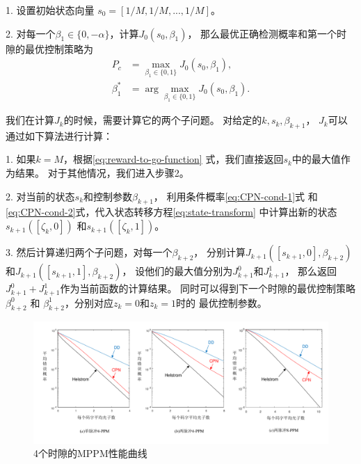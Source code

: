 1. 设置初始状态向量 $s_0=[1/M,1/M, ..., 1/M]$。

2. 对每一个$\beta_{1} \in \{0, -\alpha \}$，计算$J_0(s_0, \beta_1)$，
   那么最优正确检测概率和第一个时隙的最优控制策略为
   \begin{equation}
   \begin{split}
   P_c &= \max_{\beta_1 \in \{0, 1 \} } J_0(s_0, \beta_1), \\
   \beta_1^* &= \arg \max_{\beta_1 \in \{0, 1 \} } J_0(s_0, \beta_1).
   \end{split}
   \end{equation}

我们在计算$J_k$的时候，需要计算它的两个子问题。
对给定的$k, s_k, \beta_{k+1}$，
$J_k$可以通过如下算法进行计算：

1. 如果$k=M$，根据\ref{eq:reward-to-go-function}
   式，我们直接返回$s_k$中的最大值作为结果。
   对于其他情况，我们进入步骤2。
   
2. 对当前的状态$s_k$和控制参数$\beta_{k+1}$，
   利用条件概率\ref{eq:CPN-cond-1}式
   和\ref{eq:CPN-cond-2}式，代入状态转移方程\ref{eq:state-transform}
   中计算出新的状态$s_{k+1}([\zeta_k, 0])$
   和$s_{k+1}([\zeta_k, 1])$。
   
3. 然后计算递归两个子问题，对每一个$\beta_{k+2}$，
   分别计算$J_{k+1}([s_{k+1},0], \beta_{k+2})$
   和$J_{k+1}([s_{k+1},1], \beta_{k+2})$，
   设他们的最大值分别为$J_{k+1}^0$和$J_{k+1}^1$，
   那么返回$J_{k+1}^0 + J_{k+1}^1$作为当前函数的计算结果。
   同时可以得到下一个时隙的最优控制策略$\beta_{k+2}^0$
   和 $\beta_{k+2}^1$，分别对应$z_k=0$和$z_k=1$时的
   最优控制参数。
   
   
\begin{figure}
\centering
  \includegraphics[width=\textwidth]{figures/chap4/4MPPM-error}
  \caption{4个时隙的MPPM性能曲线}
  \label{fig:4MPPM-error}
\end{figure}

